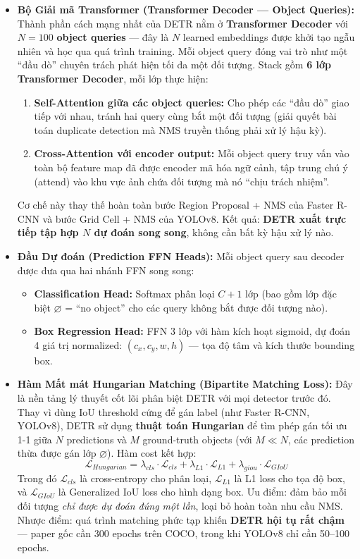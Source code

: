 \begin{itemize}
	\item \textbf{Bộ Giải mã Transformer (Transformer Decoder --- Object Queries):} Thành phần cách mạng nhất của DETR nằm ở \textbf{Transformer Decoder} với $N = 100$ \textbf{object queries} --- đây là $N$ learned embeddings được khởi tạo ngẫu nhiên và học qua quá trình training. Mỗi object query đóng vai trò như một ``đầu dò'' chuyên trách phát hiện tối đa một đối tượng. Stack gồm \textbf{6 lớp Transformer Decoder}, mỗi lớp thực hiện:
	\begin{enumerate}
		\item \textbf{Self-Attention giữa các object queries:} Cho phép các ``đầu dò'' giao tiếp với nhau, tránh hai query cùng bắt một đối tượng (giải quyết bài toán duplicate detection mà NMS truyền thống phải xử lý hậu kỳ).
		\item \textbf{Cross-Attention với encoder output:} Mỗi object query truy vấn vào toàn bộ feature map đã được encoder mã hóa ngữ cảnh, tập trung chú ý (attend) vào khu vực ảnh chứa đối tượng mà nó ``chịu trách nhiệm''.
	\end{enumerate}
	Cơ chế này thay thế hoàn toàn bước Region Proposal + NMS của Faster R-CNN và bước Grid Cell + NMS của YOLOv8. Kết quả: \textbf{DETR xuất trực tiếp tập hợp $N$ dự đoán song song}, không cần bất kỳ hậu xử lý nào.

	\item \textbf{Đầu Dự đoán (Prediction FFN Heads):} Mỗi object query sau decoder được đưa qua hai nhánh FFN song song:
	\begin{itemize}
		\item \textbf{Classification Head:} Softmax phân loại $C + 1$ lớp (bao gồm lớp đặc biệt $\varnothing$ = ``no object'' cho các query không bắt được đối tượng nào).
		\item \textbf{Box Regression Head:} FFN 3 lớp với hàm kích hoạt sigmoid, dự đoán 4 giá trị normalized: $(c_x, c_y, w, h)$ --- tọa độ tâm và kích thước bounding box.
	\end{itemize}

	\item \textbf{Hàm Mất mát Hungarian Matching (Bipartite Matching Loss):} Đây là nền tảng lý thuyết cốt lõi phân biệt DETR với mọi detector trước đó. Thay vì dùng IoU threshold cứng để gán label (như Faster R-CNN, YOLOv8), DETR sử dụng \textbf{thuật toán Hungarian} để tìm phép gán tối ưu 1-1 giữa $N$ predictions và $M$ ground-truth objects (với $M \ll N$, các prediction thừa được gán lớp $\varnothing$). Hàm cost kết hợp:
	$$\mathcal{L}_{Hungarian} = \lambda_{cls} \cdot \mathcal{L}_{cls} + \lambda_{L1} \cdot \mathcal{L}_{L1} + \lambda_{giou} \cdot \mathcal{L}_{GIoU}$$
	Trong đó $\mathcal{L}_{cls}$ là cross-entropy cho phân loại, $\mathcal{L}_{L1}$ là L1 loss cho tọa độ box, và $\mathcal{L}_{GIoU}$ là Generalized IoU loss cho hình dạng box. Ưu điểm: đảm bảo mỗi đối tượng \textit{chỉ được dự đoán đúng một lần}, loại bỏ hoàn toàn nhu cầu NMS. Nhược điểm: quá trình matching phức tạp khiến \textbf{DETR hội tụ rất chậm} --- paper gốc cần 300 epochs trên COCO, trong khi YOLOv8 chỉ cần 50--100 epochs.
\end{itemize}

